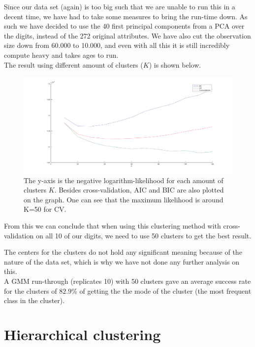 Since our data set (again) is too big such that we are unable to run this in a decent time, we have had to take some measures to bring the run-time down. As such we have decided to use the 40 first principal components from a PCA over the digits, instead of the 272 original attributes. We have also cut the observation size down from 60.000 to 10.000, and even with all this it is still incredibly compute heavy and takes ages to run. \\

The result using different amount of clusters ($K$) is shown below.

\begin{figure}[H]
\centering
\includegraphics[width=1\linewidth]{code/pca_gmm10-120_cv}
\caption{The y-axis is the negative logarithm-likelihood for each amount of clusters $K$. Besides cross-validation, AIC and BIC are also plotted on the graph. One can see that the maximum likelihood is around K=50 for CV.}
\label{fig:pca_gmm10-120_cv}
\end{figure}


From this we can conclude that when using this clustering method with cross-validation on all 10 of our digits, we need to use 50 clusters to get the best result. 

The centers for the clusters do not hold any significant meaning because of the nature of the data set, which is why we have not done any further analysis on this. \\

A GMM run-through (replicates 10) with 50 clusters gave an average success rate for the clusters of $82.9\%$ of getting the the mode of the cluster (the most frequent class in the cluster).

\section{Hierarchical clustering}

